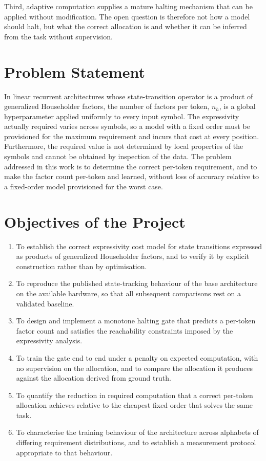 Third, adaptive computation supplies a mature halting mechanism that can be
applied without modification. The open question is therefore not how a model
should halt, but what the correct allocation is and whether it can be inferred
from the task without supervision.

\section{Problem Statement}

In linear recurrent architectures whose state-transition operator is a product of
generalized Householder factors, the number of factors per token, $n_h$, is a
global hyperparameter applied uniformly to every input symbol. The expressivity
actually required varies across symbols, so a model with a fixed order must be
provisioned for the maximum requirement and incurs that cost at every position.
Furthermore, the required value is not determined by local properties of the
symbols and cannot be obtained by inspection of the data. The problem addressed
in this work is to determine the correct per-token requirement, and to make the
factor count per-token and learned, without loss of accuracy relative to a
fixed-order model provisioned for the worst case.

\section{Objectives of the Project}

\begin{enumerate}[label={(\arabic*)}]
	\item To establish the correct expressivity cost model for state transitions
	expressed as products of generalized Householder factors, and to verify it by
	explicit construction rather than by optimisation.
	\item To reproduce the published state-tracking behaviour of the base
	architecture on the available hardware, so that all subsequent comparisons
	rest on a validated baseline.
	\item To design and implement a monotone halting gate that predicts a
	per-token factor count and satisfies the reachability constraints imposed by
	the expressivity analysis.
	\item To train the gate end to end under a penalty on expected computation,
	with no supervision on the allocation, and to compare the allocation it
	produces against the allocation derived from ground truth.
	\item To quantify the reduction in required computation that a correct
	per-token allocation achieves relative to the cheapest fixed order that solves
	the same task.
	\item To characterise the training behaviour of the architecture across
	alphabets of differing requirement distributions, and to establish a
	measurement protocol appropriate to that behaviour.
\end{enumerate}
\null
